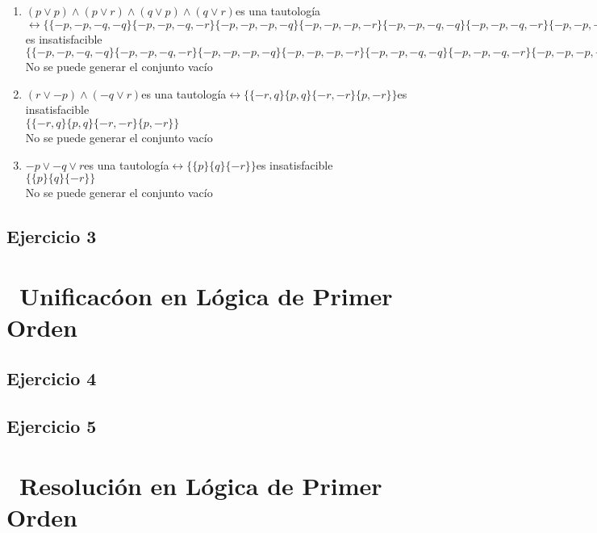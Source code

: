 \documentclass[10pt,a4paper]{article}
\begin{document}
\begin{enumerate}
    \item $(p \vee p)\wedge(p \vee r)\wedge(q \vee p)\wedge(q \vee r) $es una tautología$ \leftrightarrow \{\{-p, -p, -q, -q\} \{-p, -p, -q, -r\} \{-p, -p, -p, -q\} \{-p, -p, -p, -r\} \{-p, -p, -q, -q\} \{-p, -p, -q, -r\} \{-p, -p, -p, -q\} \{-p, -p, -p, -r\} \{-p, -r, -q, -q\} \{-p, -r, -q, -r\} \{-p, -r, -p, -q\} \{-p, -r, -p, -r\} \{-p, -r, -q, -q\} \{-p, -r, -q, -r\} \{-p, -r, -p, -q\} \{-p, -r, -p, -r\}\} $es insatisfacible \\
    $\{\{-p, -p, -q, -q\} \{-p, -p, -q, -r\} \{-p, -p, -p, -q\} \{-p, -p, -p, -r\} \{-p, -p, -q, -q\} \{-p, -p, -q, -r\} \{-p, -p, -p, -q\} \{-p, -p, -p, -r\} \{-p, -r, -q, -q\} \{-p, -r, -q, -r\} \{-p, -r, -p, -q\} \{-p, -r, -p, -r\} \{-p, -r, -q, -q\} \{-p, -r, -q, -r\} \{-p, -r, -p, -q\} \{-p, -r, -p, -r\}\}$ \\
    No se puede generar el conjunto vacío
    \item $(r \vee -p)\wedge(-q \vee r) $es una tautología$ \leftrightarrow \{\{-r, q\} \{p, q\} \{-r, -r\} \{p, -r\}\} $es insatisfacible \\
    $\{\{-r, q\} \{p, q\} \{-r, -r\} \{p, -r\}\}$ \\
    No se puede generar el conjunto vacío
    \item $-p \vee -q \vee r $es una tautología$ \leftrightarrow \{\{p\} \{q\} \{-r\}\} $es insatisfacible \\
    $\{\{p\} \{q\} \{-r\}\}$ \\
    No se puede generar el conjunto vacío
    \end{enumerate}
  \subsection{Ejercicio 3}
  \section*{\ Unificacóon en Lógica de Primer Orden}
  \subsection{Ejercicio 4}
  \subsection{Ejercicio 5}
  \section*{\ Resolución en Lógica de Primer Orden}
\end{document}
